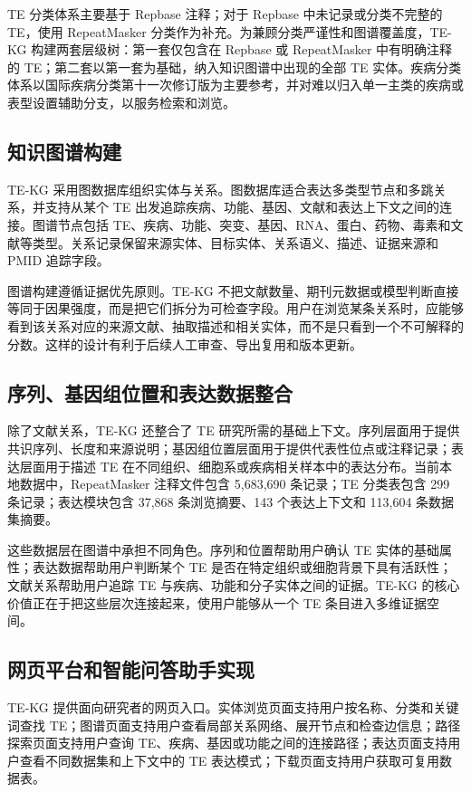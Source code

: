 \documentclass[12pt,a4paper,UTF8]{ctexart}
\begin{document}
TE 分类体系主要基于 Repbase 注释；对于 Repbase 中未记录或分类不完整的 TE，使用 RepeatMasker 分类作为补充。为兼顾分类严谨性和图谱覆盖度，TE-KG 构建两套层级树：第一套仅包含在 Repbase 或 RepeatMasker 中有明确注释的 TE；第二套以第一套为基础，纳入知识图谱中出现的全部 TE 实体。疾病分类体系以国际疾病分类第十一次修订版为主要参考\cite{icd11_who}，并对难以归入单一主类的疾病或表型设置辅助分支，以服务检索和浏览。

\subsection{知识图谱构建}

TE-KG 采用图数据库组织实体与关系。图数据库适合表达多类型节点和多跳关系，并支持从某个 TE 出发追踪疾病、功能、基因、文献和表达上下文之间的连接\cite{neo4j_graph}。图谱节点包括 TE、疾病、功能、突变、基因、RNA、蛋白、药物、毒素和文献等类型。关系记录保留来源实体、目标实体、关系语义、描述、证据来源和 PMID 追踪字段。

图谱构建遵循证据优先原则。TE-KG 不把文献数量、期刊元数据或模型判断直接等同于因果强度，而是把它们拆分为可检查字段。用户在浏览某条关系时，应能够看到该关系对应的来源文献、抽取描述和相关实体，而不是只看到一个不可解释的分数。这样的设计有利于后续人工审查、导出复用和版本更新。

\subsection{序列、基因组位置和表达数据整合}

除了文献关系，TE-KG 还整合了 TE 研究所需的基础上下文。序列层面用于提供共识序列、长度和来源说明；基因组位置层面用于提供代表性位点或注释记录；表达层面用于描述 TE 在不同组织、细胞系或疾病相关样本中的表达分布。当前本地数据中，RepeatMasker 注释文件包含 5,683,690 条记录；TE 分类表包含 299 条记录；表达模块包含 37,868 条浏览摘要、143 个表达上下文和 113,604 条数据集摘要。

这些数据层在图谱中承担不同角色。序列和位置帮助用户确认 TE 实体的基础属性；表达数据帮助用户判断某个 TE 是否在特定组织或细胞背景下具有活跃性；文献关系帮助用户追踪 TE 与疾病、功能和分子实体之间的证据。TE-KG 的核心价值正在于把这些层次连接起来，使用户能够从一个 TE 条目进入多维证据空间。

\subsection{网页平台和智能问答助手实现}

TE-KG 提供面向研究者的网页入口。实体浏览页面支持用户按名称、分类和关键词查找 TE；图谱页面支持用户查看局部关系网络、展开节点和检查边信息；路径探索页面支持用户查询 TE、疾病、基因或功能之间的连接路径；表达页面支持用户查看不同数据集和上下文中的 TE 表达模式；下载页面支持用户获取可复用数据表。
\end{document}
